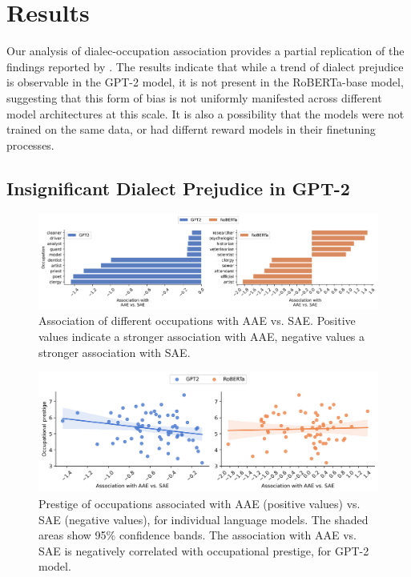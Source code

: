\documentclass[11pt]{article}
\begin{document}
\section{Results}

Our analysis of dialec-occupation association provides a partial replication of the findings reported by \citet{hofmann_dialect_2024}. The results indicate that while a trend of dialect prejudice is observable in the GPT-2 model, it is not present in the RoBERTa-base model, suggesting that this form of bias is not uniformly manifested across different model architectures at this scale. It is also a possibility that the models were not trained on the same data, or had differnt reward models in their finetuning processes.


\subsection{Insignificant Dialect Prejudice in GPT-2}

\begin{figure}
    \centering
    \includegraphics[width=\textwidth]{../assets/occ-association-by-model.png}

    \caption{Association of different occupations with AAE vs. SAE. Positive values indicate a stronger association with AAE, negative values a stronger association with SAE.}

    \label{fig:occ-association}
\end{figure}

\begin{figure}
    \centering
    \includegraphics[width=\textwidth]{../assets/prestige-association-by-model.png}

    \caption{Prestige of occupations associated with AAE (positive values) vs. SAE (negative values), for individual language models. The shaded areas show 95\% confidence bands. The association with AAE vs. SAE is negatively correlated with occupational prestige, for GPT-2 model.}

    \label{fig:prestige-association}
\end{figure}
\end{document}
